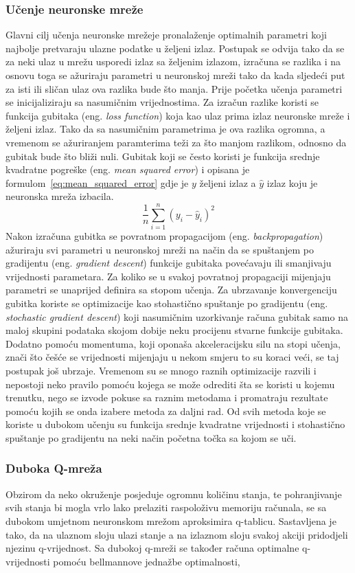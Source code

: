 \subsubsection{Učenje neuronske mreže}
Glavni cilj učenja neuronske mrežeje pronalaženje optimalnih parametri koji najbolje pretvaraju ulazne podatke u željeni izlaz. Postupak se odvija tako da se za neki ulaz u mrežu usporedi izlaz sa željenim izlazom, izračuna se razlika i na osnovu toga se ažuriraju parametri u neuronskoj mreži tako da kada sljedeći put za isti ili sličan ulaz ova razlika bude što manja. Prije početka učenja parametri se inicijaliziraju sa nasumičnim vrijednostima. Za izračun razlike koristi se funkcija gubitaka (eng. \textit{loss function}) koja kao ulaz prima izlaz neuronske mreže i željeni izlaz. Tako da sa nasumičnim parametrima je ova razlika ogromna, a vremenom se ažuriranjem paramterima teži za što manjom razlikom, odnosno da gubitak bude što bliži nuli. Gubitak koji se često koristi je funkcija srednje kvadratne pogreške (eng. \textit{mean squared error}) i opisana je formulom~\ref{eq:mean_squared_error} gdje je $y$ željeni izlaz a $\hat{y}$ izlaz koju je neuronska mreža izbacila. 
\begin{equation}\label{eq:mean_squared_error}
\frac{1}{n}\sum_{i=1}^{n}(y_i - \hat{y}_i)^2
\end{equation}
Nakon izračuna gubitka se povratnom propagacijom (eng. \textit{backpropagation}) ažuriraju svi parametri u neuronskoj mreži na način da se spuštanjem po gradijentu (eng. \textit{gradient descent}) funkcije gubitaka povećavaju ili smanjivaju vrijednosti parametara. Za koliko se u svakoj povratnoj propagaciji mijenjaju parametri se unaprijed definira sa stopom učenja. Za ubrzavanje konvergenciju gubitka koriste se optimizacije kao stohastično spuštanje po gradijentu (eng. \textit{stochastic gradient descent}) koji nasumičnim uzorkivanje računa gubitak samo na maloj skupini podataka skojom dobije neku procijenu stvarne funkcije gubitaka. Dodatno pomoću momentuma, koji oponaša akceleracijsku silu na stopi učenja, znači što češće se vrijednosti mijenjaju u nekom smjeru to su koraci veći, se taj postupak još ubrzaje. Vremenom su se mnogo raznih optimizacije razvili i nepostoji neko pravilo pomoću kojega se može odrediti šta se koristi u kojemu trenutku, nego se izvode pokuse sa raznim metodama i promatraju rezultate pomoću kojih se onda izabere metoda za daljni rad. Od svih metoda koje se koriste u dubokom učenju su funkcija srednje kvadratne vrijednosti i stohastično spuštanje po gradijentu na neki način početna točka sa kojom se uči.

\subsubsection{Duboka Q-mreža}
Obzirom da neko okruženje posjeduje ogromnu količinu stanja, te pohranjivanje svih stanja bi mogla vrlo lako prelaziti raspoloživu memoriju računala, se sa dubokom umjetnom neuronskom mrežom aproksimira q-tablicu. Sastavljena je tako, da na ulaznom sloju ulazi stanje a na izlaznom sloju svakoj akciji pridodjeli njezinu q-vrijednost. Sa dubokoj q-mreži se također računa optimalne q-vrijednosti pomoću bellmannove jednažbe optimalnosti, 
